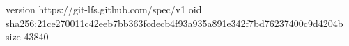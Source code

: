 version https://git-lfs.github.com/spec/v1
oid sha256:21ce270011c42eeb7bb363fcdecb4f93a935a891e342f7bd76237400c9d4204b
size 43840
